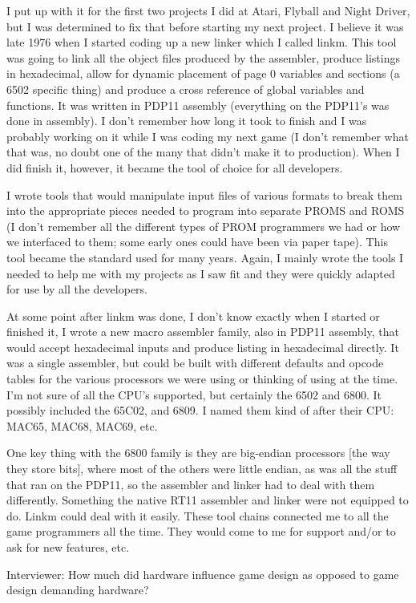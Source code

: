 I put up with it for the first two projects I did at Atari, Flyball and Night Driver, but I was determined to fix that before starting my next project. I believe it was late 1976 when I started coding up a new linker which I called linkm. This tool was going to link all the object files produced by the assembler, produce listings in hexadecimal, allow for dynamic placement of page 0 variables and sections (a 6502 specific thing) and produce a cross reference of global variables and functions. It was written in PDP11 assembly (everything on the PDP11's was done in assembly). I don't remember how long it took to finish and I was probably working on it while I was coding my next game (I don't remember what that was, no doubt one of the many that didn't make it to production). When I did finish it, however, it became the tool of choice for all developers.

I wrote tools that would manipulate input files of various formats to break them into the appropriate pieces needed to program into separate PROMS and ROMS (I don't remember all the different types of PROM programmers we had or how we interfaced to them; some early ones could have been via paper tape). This tool became the standard used for many years. Again, I mainly wrote the tools I needed to help me with my projects as I saw fit and they were quickly adapted for use by all the developers.

At some point after linkm was done, I don't know exactly when I started or finished it, I wrote a new macro assembler family, also in PDP11 assembly, that would accept hexadecimal inputs and produce listing in hexadecimal directly. It was a single assembler, but could be built with different defaults and opcode tables for the various processors we were using or thinking of using at the time. I'm not sure of all the CPU's supported, but certainly the 6502 and 6800. It possibly included the 65C02, and 6809. I named them kind of after their CPU: MAC65, MAC68, MAC69, etc. 

One key thing with the 6800 family is they are big-endian processors [the way they store bits], where most of the others were little endian, as was all the stuff that ran on the PDP11, so the assembler and linker had to deal with them differently. Something the native RT11 assembler and linker were not equipped to do. Linkm could deal with it easily. These tool chains connected me to all the game programmers all the time. They would come to me for support and/or to ask for new features, etc.

\textcolor{interviewer}{Interviewer:} How much did hardware influence game design as opposed to game design demanding hardware?

